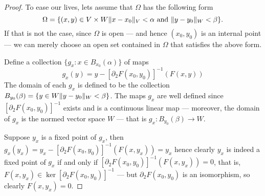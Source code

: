 \begin{proof}
    To ease our lives, lets assume that \(\Omega\) has the following form
    \[
        \Omega = \{(x, y) \in V \times W \relax \lVert x - x_{0}\rVert_{V} < \alpha
        \text{ and } \lVert y - y_0\rVert_W < \beta\}.
    \]
    If that is not the case, since \(\Omega\) is open --- and hence \((x_{0}, y_0)\) is
    an internal point --- we can merely choose an open set contained in \(\Omega\) that
    satisfies the above form.

    Define a collection \(\{g_{x} \colon x \in B_{x_0}(\alpha)\}\) of maps
    \[
        g_{x}(y) = y - [\partial_2F(x_0, y_0)]^{-1} (F(x, y))
    \]
    The domain of each \(g_x\) is defined to be the collection \(B_{y_0}(\beta) = \{y
    \in W \relax \lVert y - y_0\rVert_W < \beta\}\). The maps \(g_{x}\) are well defined since
    \([\partial_2F(x_0, y_0)]^{-1}\) exists and is a continuous linear map --- moreover, the
    domain of \(g_x\) is the normed vector space \(W\) --- that is \(g_x: B_{y_0}(\beta) \to
    W\).

    Suppose \(y_x\) is a fixed point of \(g_x\), then \(g_x(y_x) = y_x -
    [\partial_2F(x_0, y_0)]^{-1}(F(x, y_x)) = y_{x}\) hence clearly \(y_x\) is indeed a
    fixed point of \(g_x\) if and only if \([\partial_2F(x_0, y_0)]^{-1}(F(x, y_x)) =
    0\), that is, \(F(x, y_x) \in \ker [\partial_2F(x_0, y_0)]^{-1}\) --- but \(\partial_2 F(x_0,
    y_0)\) is an isomorphism, so clearly \(F(x, y_x) = 0\).


\end{proof}
